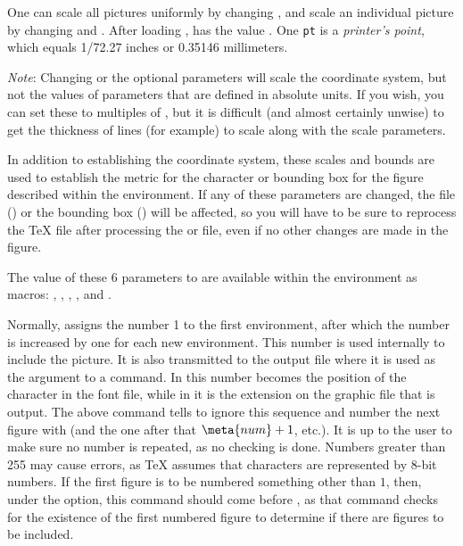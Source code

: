 \documentclass[letterpaper]{article}
\begin{document}
One can scale all pictures uniformly by changing , and
scale an individual picture by changing  and .
After loading \mfp{},  has the value \dim{1pt}. One
\texttt{pt} is a \emph{printer's point}, which equals 1/72.27 inches or
0.35146 millimeters.

\emph{Note}: Changing  or the optional parameters will
scale the coordinate system, but not the values of parameters that are
defined in absolute units. If you wish, you can set these to multiples
of , but it is difficult (and almost certainly unwise) to
get the thickness of lines (for example) to scale along with the scale
parameters.

In addition to establishing the coordinate system, these scales and
bounds are used to establish the metric for the \MF{} character or
bounding box for the \MP{} figure described within the environment. If
any of these parameters are changed, the  file (\MF{}) or the
bounding box (\MP{}) will be affected, so you will have to be sure to
reprocess the \TeX{} file after processing the  or 
file, even if no other changes are made in the figure.

The value of these 6 parameters to  are available within the
environment as macros: , , , ,
 and .

\begin{cd}
%
\end{cd}

Normally,  assigns the number 1 to the first 
environment, after which the number is increased by one for each new
 environment. This number is used internally to include the
picture. It is also transmitted to the output file where it is used as
the argument to a  command. In \MF{} this number becomes
the position of the character in the font file, while in \MP{} it is the
extension on the graphic file that is output. The above command tells
\mfp{} to ignore this sequence and number the next 
figure with  (and the one after that $\meta{num}+1$, etc.). It
is up to the user to make sure no number is repeated, as no checking is
done. Numbers greater than 255 may cause errors, as \TeX{} assumes that
characters are represented by 8-bit numbers. If the first figure is to
be numbered something other than $1$, then, under the 
option, this command should come before , as that
command checks for the existence of the first numbered figure to
determine if there are figures to be included.
\end{document}
